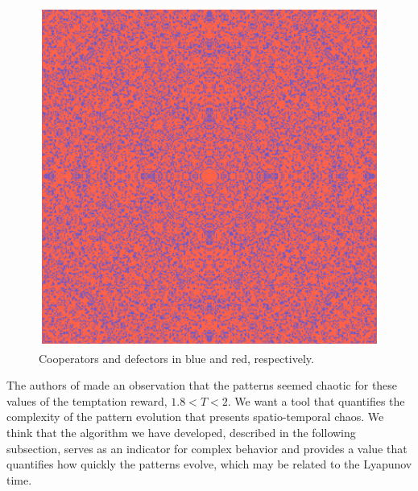 \begin{figure}
    \centering
    \includegraphics[width=1\linewidth]{Images/P3/PGG_Proportion.eps}
    \caption{Cooperators and defectors in blue and red, respectively.}
    \label{fig:GranPlot}
\end{figure}

The authors of \cite{SpatialChaos} made an observation that the patterns seemed chaotic for these values of the temptation reward, $1.8 < T < 2$. We want a tool that quantifies the complexity of the pattern evolution that presents spatio-temporal chaos. We think that the algorithm we have developed, described in the following subsection, serves as an indicator for complex behavior and provides a value that quantifies how quickly the patterns evolve, which may be related to the Lyapunov time.



